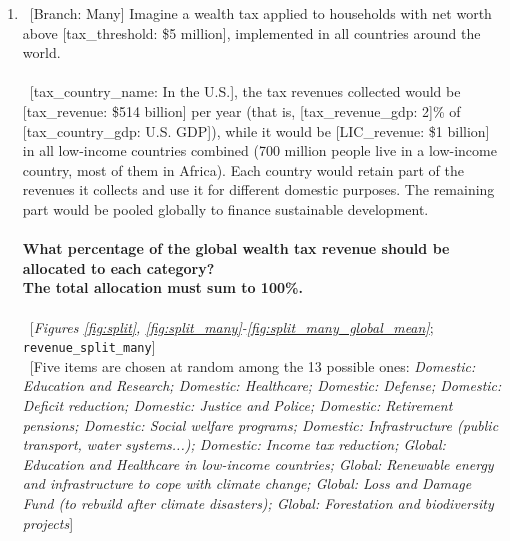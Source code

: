 \begin{enumerate}[resume]
\item ~[Branch: Many] \label{q:revenue_split_many} Imagine a wealth tax applied to households with net worth above [tax\_threshold: \$5 million], implemented in all countries around the world.
~\\\\ 
~[tax\_country\_name: In the U.S.], the tax revenues collected would be [tax\_revenue: \$514 billion] per year (that is, [tax\_revenue\_gdp: 2]\% of [tax\_country\_gdp: U.S. GDP]), while it would be [LIC\_revenue: \$1 billion] in all low-income countries combined (700 million people live in a low-income country, most of them in Africa).
Each country would retain part of the revenues it collects and use it for different domestic purposes. The remaining part would be pooled globally to finance sustainable development.
~\\\\\textbf{What percentage of the global wealth tax revenue should be allocated to each category?}~\\\textbf{The total allocation must sum to
100\%.}\\\\ 
~[\textit{Figures \ref{fig:split}, \ref{fig:split_many}-\ref{fig:split_many_global_mean}}; 
\verb|revenue_split_many|]
  \\ ~[Five items are chosen at random among the 13 possible ones: \textit{Domestic: Education and Research; Domestic: Healthcare; Domestic: Defense; Domestic: Deficit reduction; Domestic: Justice and Police; Domestic: Retirement pensions; Domestic: Social welfare programs; Domestic: Infrastructure (public transport, water systems...); Domestic: Income tax reduction; Global: Education and Healthcare in low-income countries; Global: Renewable energy and infrastructure to cope with climate change; Global: Loss and Damage Fund (to rebuild after climate disasters); Global: Forestation and biodiversity projects}]


\end{enumerate} 

